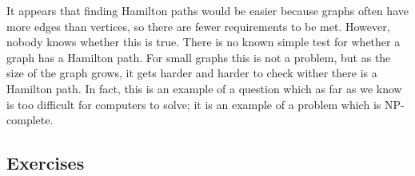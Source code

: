 \documentclass[10pt,]{book}
\theoremstyle{plain}
\theoremstyle{definition}
\theoremstyle{definition}
\theoremstyle{definition}
\theoremstyle{definition}
\numberwithin{equation}{chapter}
\begin{document}
\hypertarget{p-1663}{}%
It appears that finding Hamilton paths would be easier because graphs often have more edges than vertices, so there are fewer requirements to be met. However, nobody knows whether this is true. There is no known simple test for whether a graph has a Hamilton path. For small graphs this is not a problem, but as the size of the graph grows, it gets harder and harder to check wither there is a Hamilton path. In fact, this is an example of a question which as far as we know is too difficult for computers to solve; it is an example of a problem which is NP-complete.%
\typeout{************************************************}
\typeout{************************************************}
\subsection[{Exercises}]{Exercises}\label{exercises_gt-paths}
\end{document}

